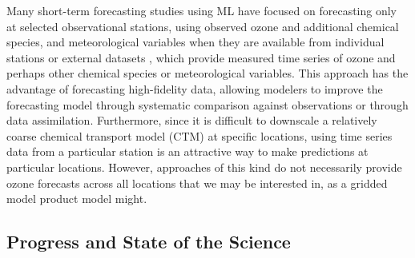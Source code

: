 \documentclass[gmd, manuscript]{copernicus}
\begin{document}
Many short-term forecasting studies using ML have focused on forecasting only at selected observational stations, using observed ozone and additional chemical species, and meteorological variables when they are available from individual stations or external datasets \cite{Comrie1997, cobourn_comparison_2000, Kolehmainen2001,Eslami2020, sayeed_novel_2021, leufen_o3resnet_2023, Hickman2023}, which provide measured time series of ozone and perhaps other chemical species or meteorological variables. This approach has the advantage of forecasting high-fidelity data, allowing modelers to improve the forecasting model through systematic comparison against observations or through data assimilation. Furthermore, since it is difficult to downscale a relatively coarse chemical transport model (CTM) at specific locations, using time series data from a particular station is an attractive way to make predictions at particular locations. However, approaches of this kind do not necessarily provide ozone forecasts across all locations that we may be interested in, as a gridded model product model might.

\subsection{Progress and State of the Science}
\end{document}
